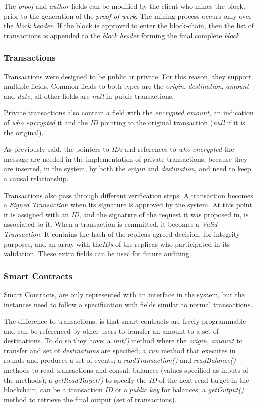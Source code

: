 \documentclass[10pt,journal,compsoc]{IEEEtran}
\begin{document}
	The \textit{proof} and \textit{author} fields can be modified by the client who mines the block, prior to the generation of the \textit{proof of work}. The mining process occurs only over the \textit{block header}. If the block is approved to enter the block-chain, then the list of transactions is appended to the \textit{block header} forming the final complete \textit{block}.
	
	\subsubsection{Transactions}
	Transactions were designed to be public or private. For this reason, they support multiple fields. 
	Common fields to both types are the \textit{origin}, \textit{destination}, \textit{amount} and \textit{date}, all other fields are \textit{null} in public transactions.
	
	Private transactions also contain a field with the \textit{encrypted amount}, an indication of \textit{who encrypted} it and the \textit{ID} pointing to the original transaction (\textit{null} if it is the original).
	
	As previously said, the pointers to \textit{IDs} and references to \textit{who encrypted} the message are needed in the implementation of private transactions, because they are inserted, in the system, by both the \textit{origin} and \textit{destination}, and need to keep a causal relationship.
	
	Transactions also pass through different verification steps. A transaction becomes a \textit{Signed Transaction} when its signature is approved by the system. At this point it is assigned with an \textit{ID}, and the signature of the request it was proposed in, is associated to it. 
	When a transaction is committed, it becomes a \textit{Valid Transaction}. It contains the hash of the replicas agreed decision, for integrity purposes, and an array with the\textit{IDs} of the replicas who participated in its validation. These extra fields can be used for future auditing.
	
	\subsubsection{Smart Contracts}
	Smart Contracts, are only represented with an interface in the system, but the instances need to follow a specification with fields similar to normal transactions.
	
	The difference to transactions, is that smart contracts are freely programmable and can be referenced by other users to transfer an amount to a set of destinations.
	To do so they have: a \textit{init()} method where the \textit{origin}, \textit{amount} to transfer and set of \textit{destinations} are specified; a \textit{run} method that executes in rounds and produces a set of events; a \textit{readTransaction()} and \textit{readBalance()} methods to read transactions and consult balances (values specified as inputs of the methods); a \textit{getReadTarget()} to specify the \textit{ID} of the next read target in the blockchain, can be a transaction \textit{ID} or a \textit{public key} for balances; a \textit{getOutput()} method to retrieve the final output (set of transactions).
	
\end{document}
